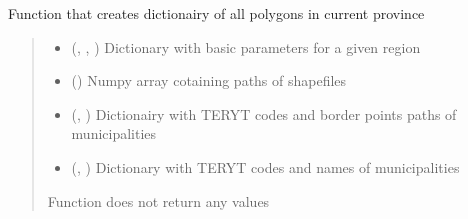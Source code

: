 \documentclass[letterpaper,10pt,english]{sphinxmanual}
\begin{document}
\begin{fulllineitems}
\label{\detokenize{pcm_utilities:pcm_utilities.create_geom_dict}}
\pysigstartsignatures
{}
\pysigstopsignatures
\sphinxAtStartPar
Function that creates dictionairy of all polygons in current province
\begin{quote}\begin{description}
\begin{itemize}
\item {} 
\sphinxAtStartPar
{} (\sphinxcode{\sphinxupquote{Dict}}{[}, \sphinxcode{\sphinxupquote{Dict}}{[}, \sphinxcode{\sphinxupquote{Any}}{]}{]}) \textendash{} Dictionary with basic parameters for a given region

\item {} 
\sphinxAtStartPar
{} () \textendash{} Numpy array cotaining paths of shapefiles

\item {} 
\sphinxAtStartPar
{} (\sphinxcode{\sphinxupquote{Dict}}{[}, \sphinxcode{\sphinxupquote{List}}{[}\sphinxcode{\sphinxupquote{Any}}{]}{]}) \textendash{} Dictionairy with TERYT codes and border points paths of municipalities

\item {} 
\sphinxAtStartPar
{} (\sphinxcode{\sphinxupquote{Dict}}{[}, \sphinxcode{\sphinxupquote{str}}{]}) \textendash{} Dictionary with TERYT codes and names of municipalities

\end{itemize}

\sphinxAtStartPar
{}

\sphinxAtStartPar
Function does not return any values

\end{description}\end{quote}

\end{fulllineitems}
\end{document}
